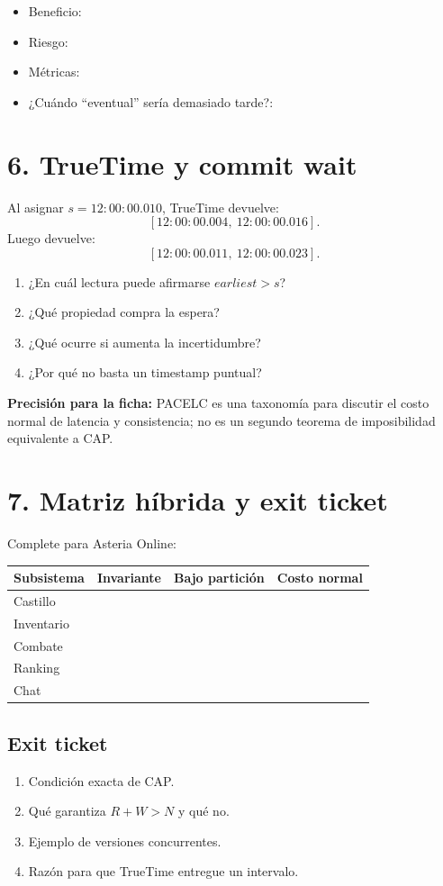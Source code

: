 \documentclass[variant=guia,cover=institutional,mode=print]{ua-engineering-v6-article}
\begin{document}
\begin{itemize}
\item Beneficio: \hrulefill
\item Riesgo: \hrulefill
\item Métricas: \hrulefill
\item ¿Cuándo ``eventual'' sería demasiado tarde?: \vspace{1cm}
\end{itemize}

\newpage
\section{6. TrueTime y commit wait}
Al asignar $s=12{:}00{:}00.010$, TrueTime devuelve:
\[
[12{:}00{:}00.004,\ 12{:}00{:}00.016].
\]
Luego devuelve:
\[
[12{:}00{:}00.011,\ 12{:}00{:}00.023].
\]

\begin{enumerate}
\item ¿En cuál lectura puede afirmarse $earliest>s$? \hrulefill
\item ¿Qué propiedad compra la espera? \vspace{0.8cm}
\item ¿Qué ocurre si aumenta la incertidumbre? \vspace{0.8cm}
\item ¿Por qué no basta un timestamp puntual? \vspace{0.8cm}
\end{enumerate}

\newpage

\begin{uainfo}
\textbf{Precisión para la ficha:} PACELC es una taxonomía para discutir el costo normal de latencia y consistencia; no es un segundo teorema de imposibilidad equivalente a CAP.
\end{uainfo}

\section{7. Matriz híbrida y exit ticket}
Complete para Asteria Online:

\begin{tabular}{p{}p{}p{}p{}}
\toprule
Subsistema & Invariante & Bajo partición & Costo normal \\
\midrule
Castillo & \rule{0pt}{1cm} & & \\
Inventario & \rule{0pt}{1cm} & & \\
Combate & \rule{0pt}{1cm} & & \\
Ranking & \rule{0pt}{1cm} & & \\
Chat & \rule{0pt}{1cm} & & \\
\bottomrule
\end{tabular}

\subsection*{Exit ticket}
\begin{enumerate}
\item Condición exacta de CAP.
\item Qué garantiza $R+W>N$ y qué no.
\item Ejemplo de versiones concurrentes.
\item Razón para que TrueTime entregue un intervalo.
\end{enumerate}
\end{document}
